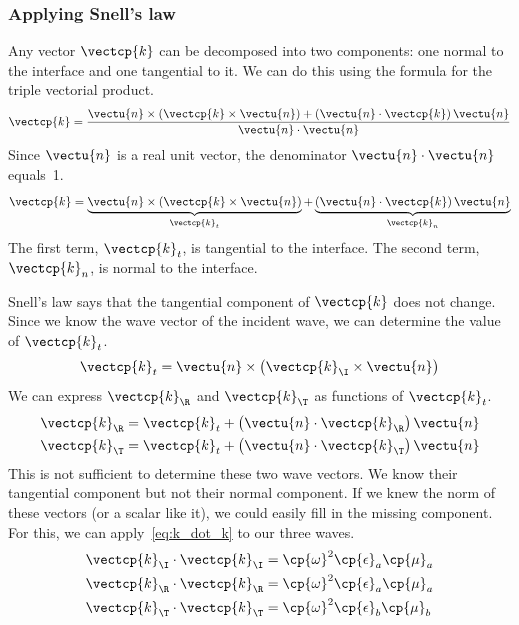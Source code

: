 \subsubsection{Applying Snell's law}
\label{sec:applying_snells_law}
Any vector $\vectcp{k}$ can be decomposed into two components: one normal to the interface and one tangential to it.
We can do this using the formula for the triple vectorial product.
\begin{equation}
    \vectcp{k}
    =
    \frac{
        \vectu{n} \times \left(\vectcp{k} \times \vectu{n}\right)
        +
        \left(\vectu{n} \cdot \vectcp{k}\right) \vectu{n}
    }{
        \vectu{n} \cdot \vectu{n}
    }
\end{equation}
Since $\vectu{n}$ is a real unit vector, the denominator $\vectu{n} \cdot \vectu{n}$ equals~1.
\begin{equation}
    \vectcp{k}
    =
    \underbrace{\vectu{n} \times \left(\vectcp{k} \times \vectu{n}\right)}_{\vectcp{k}_t}
    +
    \underbrace{\left(\vectu{n} \cdot \vectcp{k}\right) \vectu{n}}_{\vectcp{k}_n}
\end{equation}
The first term, $\vectcp{k}_t$, is tangential to the interface.
The second term, $\vectcp{k}_n$, is normal to the interface.

Snell's law says that the tangential component of $\vectcp{k}$ does not change.
Since we know the wave vector of the incident wave, we can determine the value of $\vectcp{k}_t$.
\begin{equation}
    \vectcp{k}_t = \vectu{n} \times \left(\vectcp{k}_\I \times \vectu{n}\right)
\end{equation}
We can express $\vectcp{k}_\R$ and $\vectcp{k}_\T$ as functions of $\vectcp{k}_t$.
\begin{align}
    \vectcp{k}_\R &= \vectcp{k}_t + \left(\vectu{n} \cdot \vectcp{k}_\R\right)\vectu{n}
    \\
    \vectcp{k}_\T &= \vectcp{k}_t + \left(\vectu{n} \cdot \vectcp{k}_\T\right)\vectu{n}
\end{align}
This is not sufficient to determine these two wave vectors.
We know their tangential component but not their normal component.
If we knew the norm of these vectors (or a scalar like it), we could easily fill in the missing component.
For this, we can apply~\cref{eq:k_dot_k} to our three waves.
\begin{align}
    \vectcp{k}_\I \cdot \vectcp{k}_\I &= \cp{\omega}^2 \cp{\epsilon}_a \cp{\mu}_a \\
    \vectcp{k}_\R \cdot \vectcp{k}_\R &= \cp{\omega}^2 \cp{\epsilon}_a \cp{\mu}_a \\
    \vectcp{k}_\T \cdot \vectcp{k}_\T &= \cp{\omega}^2 \cp{\epsilon}_b \cp{\mu}_b
\end{align}

